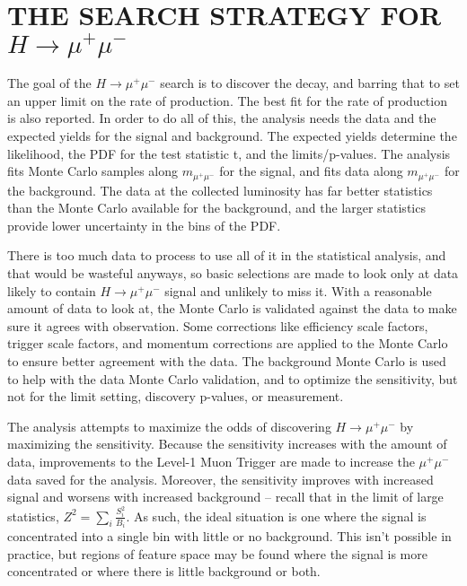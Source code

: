 \chapter{THE SEARCH STRATEGY FOR $H\rightarrow\mu^+\mu^-$} \label{strategy}

The goal of the $H\rightarrow\mu^+\mu^-$ search is to discover the decay, and barring that to set an upper limit on the rate of production. The best fit for the rate of production is also reported. In order to do all of this, the analysis needs the data and the expected yields for the signal and background. The expected yields determine the likelihood, the PDF for the test statistic t, and the limits/p-values. The analysis fits Monte Carlo samples along $m_{\mu^+\mu^-}$ for the signal, and fits data along $m_{\mu^+\mu^-}$ for the background. The data at the collected luminosity has far better statistics than the Monte Carlo available for the background, and the larger statistics provide lower uncertainty in the bins of the PDF. 

There is too much data to process to use all of it in the statistical analysis, and that would be wasteful anyways, so basic selections are made to look only at data likely to contain $H\rightarrow\mu^+\mu^-$ signal and unlikely to miss it. With a reasonable amount of data to look at, the Monte Carlo is validated against the data to make sure it agrees with observation. Some corrections like efficiency scale factors, trigger scale factors, and momentum corrections are applied to the Monte Carlo to ensure better agreement with the data. The background Monte Carlo is used to help with the data Monte Carlo validation, and to optimize the sensitivity, but not for the limit setting, discovery p-values, or measurement. 

The analysis attempts to maximize the odds of discovering $H\rightarrow\mu^+\mu^-$ by maximizing the sensitivity. Because the sensitivity increases with the amount of data, improvements to the Level-1 Muon Trigger are made to increase the $\mu^+\mu^-$ data saved for the analysis. Moreover, the sensitivity improves with increased signal and worsens with increased background -- recall that in the limit of large statistics, $Z^2=\sum_i\frac{S_i^2}{B_i}$. As such, the ideal situation is one where the signal is concentrated into a single bin with little or no background. This isn't possible in practice, but regions of feature space may be found where the signal is more concentrated or where there is little background or both. 

